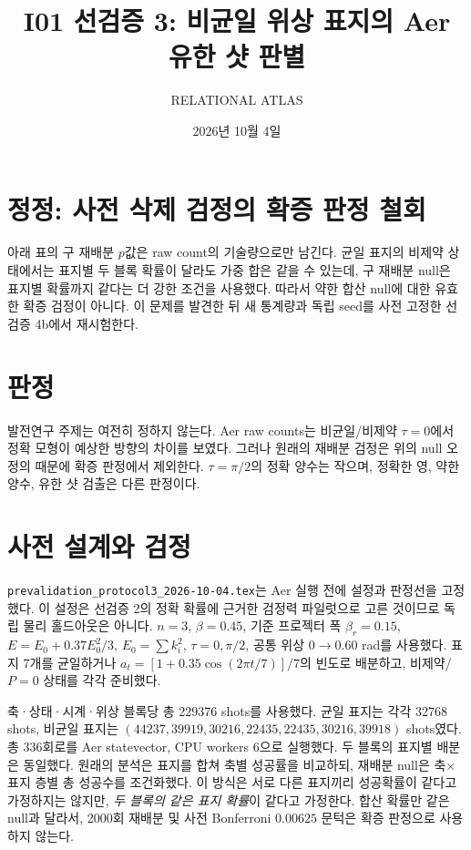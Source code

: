 \documentclass[11pt,a4paper]{article}
\title{I01 선검증 3: 비균일 위상 표지의 Aer 유한 샷 판별}
\author{RELATIONAL ATLAS}
\date{2026년 10월 4일}
\begin{document}
\maketitle

\section*{정정: 사전 삭제 검정의 확증 판정 철회}
아래 표의 구 재배분 $p$값은 raw count의 기술량으로만 남긴다.
균일 표지의 비제약 상태에서는 표지별 두 블록 확률이 달라도
가중 합은 같을 수 있는데, 구 재배분 null은 표지별 확률까지
같다는 더 강한 조건을 사용했다. 따라서 약한 합산 null에 대한
유효한 확증 검정이 아니다. 이 문제를 발견한 뒤 새 통계량과
독립 seed를 사전 고정한 선검증 4b에서 재시험한다.

\section{판정}
발전연구 주제는 여전히 정하지 않는다. Aer raw counts는
비균일/비제약 $\tau=0$에서 정확 모형이 예상한 방향의 차이를
보였다. 그러나 원래의 재배분 검정은 위의 null 오정의 때문에
확증 판정에서 제외한다. $\tau=\pi/2$의 정확 양수는 작으며,
정확한 영, 약한 양수, 유한 샷 검출은 다른 판정이다.

\section{사전 설계와 검정}
\texttt{prevalidation\_protocol3\_2026-10-04.tex}는 Aer 실행 전에
설정과 판정선을 고정했다. 이 설정은 선검증 2의 정확 확률에 근거한
검정력 파일럿으로 고른 것이므로 독립 물리 홀드아웃은 아니다.
$n=3$, $\beta=0.45$, 기준 프로젝터 폭 $\beta_r=0.15$,
$E=E_0+0.37E_0^2/3$, $E_0=\sum k_i^2$,
$\tau=0,\pi/2$, 공통 위상 $0\to0.60$ rad를 사용했다.
표지 7개를 균일하거나
$a_t=[1+0.35\cos(2\pi t/7)]/7$의 빈도로 배분하고,
비제약/$P=0$ 상태를 각각 준비했다.

축·상태·시계·위상 블록당 총 229376 shots를 사용했다.
균일 표지는 각각 32768 shots, 비균일 표지는
$(44237,39919,30216,22435,22435,30216,39918)$ shots였다.
총 336회로를 Aer statevector, CPU workers 6으로 실행했다.
두 블록의 표지별 배분은 동일했다. 원래의 분석은 표지를 합쳐
축별 성공률을 비교하되, 재배분 null은 축$\times$표지 층별
총 성공수를 조건화했다. 이 방식은 서로 다른 표지끼리 성공확률이
같다고 가정하지는 않지만, \emph{두 블록의 같은 표지 확률}이
같다고 가정한다. 합산 확률만 같은 null과 달라서, 2000회
재배분 및 사전 Bonferroni $0.00625$ 문턱은 확증 판정으로
사용하지 않는다.
\end{document}
